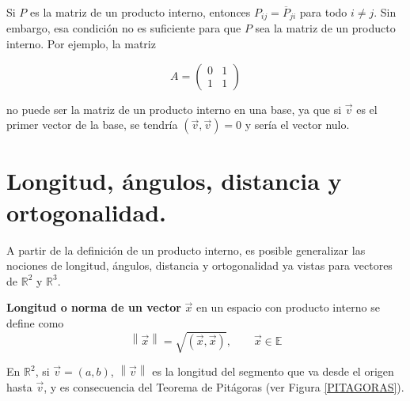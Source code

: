 \bigskip

\bigskip


\begin{remark}
    Si $P$ es la matriz de un producto interno, entonces $P_{ij}=\overline P_{ji}$  para todo $i\neq j$. Sin embargo, esa condición no es suficiente para que $P$ sea la matriz de un producto interno. Por ejemplo, la matriz  

$$A= \left(\begin{array}{cc}  0 & 1  \\ 1 &  1
\end{array}
 \right)$$
 
 \bigskip
 
 \noindent
 no puede ser la matriz de un producto interno en una base, ya que si $ \vec v$ es el primer vector de la base, se tendría $(\vec v,\vec v)=0$ y sería el vector nulo.
\end{remark}

 






\section{Longitud, ángulos, distancia y ortogonalidad.}

\bigskip

A partir de la definición de un producto interno, es posible  generalizar las nociones de longitud, ángulos, distancia y ortogonalidad ya vistas para vectores de $\mathbb{R}^{2}$ y $\mathbb{R}^{3}$.

\bigskip

\begin{definition}
\textbf{Longitud o norma de un vector} $\vec{x}$ en un espacio  con producto interno se define como
\begin{equation}
 \left\| \vec{x}\right\|=\sqrt{(\vec{x},\vec{x})},\qquad \vec{x}\in \mathbb{E} 
 \label{10}
\end{equation}
\end{definition}

\bigskip

\begin{example}
En $\mathbb{R}^2 $, si $\vec{v}= (a , b)$,  $\left\| \vec{v}\right\| $  es la longitud del segmento que va desde el origen hasta $\vec{v}$, y es consecuencia del Teorema de Pitágoras (ver Figura \ref{PITAGORAS}).




\end{example}

